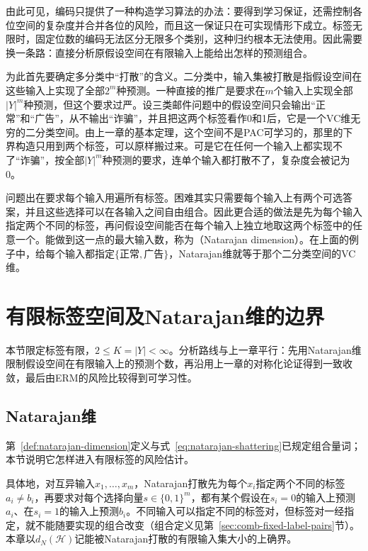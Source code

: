 由此可见，编码只提供了一种构造学习算法的办法：要得到学习保证，还需控制各位空间的复杂度并合并各位的风险，而且这一保证只在可实现情形下成立。标签无限时，固定位数的编码无法区分无限多个类别，这种归约根本无法使用。因此需要换一条路：直接分析原假设空间在有限输入上能给出怎样的预测组合。

为此首先要确定多分类中“打散”的含义。二分类中，输入集被打散是指假设空间在这些输入上实现了全部$2^m$种预测。一种直接的推广是要求在$m$个输入上实现全部$|Y|^m$种预测，但这个要求过严。设三类邮件问题中的假设空间只会输出“正常”和“广告”，从不输出“诈骗”，并且把这两个标签看作0和1后，它是一个VC维无穷的二分类空间。由上一章的基本定理，这个空间不是PAC可学习的，那里的下界构造只用到两个标签，可以原样搬过来。可是它在任何一个输入上都实现不了“诈骗”，按全部$|Y|^m$种预测的要求，连单个输入都打散不了，复杂度会被记为0。

问题出在要求每个输入用遍所有标签。困难其实只需要每个输入上有两个可选答案，并且这些选择可以在各输入之间自由组合。因此更合适的做法是先为每个输入指定两个不同的标签，再问假设空间能否在每个输入上独立地取这两个标签中的任意一个。能做到这一点的最大输入数，称为（Natarajan dimension）。在上面的例子中，给每个输入都指定$\{\text{正常},\text{广告}\}$，Natarajan维就等于那个二分类空间的VC维。

\section{有限标签空间及Natarajan维的边界}
\label{sec:multiclass-dimensions}

本节限定标签有限，$2\leq K=|Y|<\infty$。分析路线与上一章平行：先用Natarajan维限制假设空间在有限输入上的预测个数，再沿用上一章的对称化论证得到一致收敛，最后由ERM的风险比较得到可学习性。

\subsection{Natarajan维}

第~\ref{def:natarajan-dimension}定义与式~\eqref{eq:natarajan-shattering}已规定组合量词；本节说明它怎样进入有限标签的风险估计。

具体地，对互异输入$x_1,\ldots,x_m$，Natarajan打散先为每个$x_i$指定两个不同的标签$a_i\neq b_i$，再要求对每个选择向量$s\in\{0,1\}^m$，都有某个假设在$s_i=0$的输入上预测$a_i$、在$s_i=1$的输入上预测$b_i$。不同输入可以指定不同的标签对，但标签对一经指定，就不能随要实现的组合改变（组合定义见第~\ref{sec:comb-fixed-label-pairs}节）。本章以$d_N(\mathcal H)$记能被Natarajan打散的有限输入集大小的上确界。

